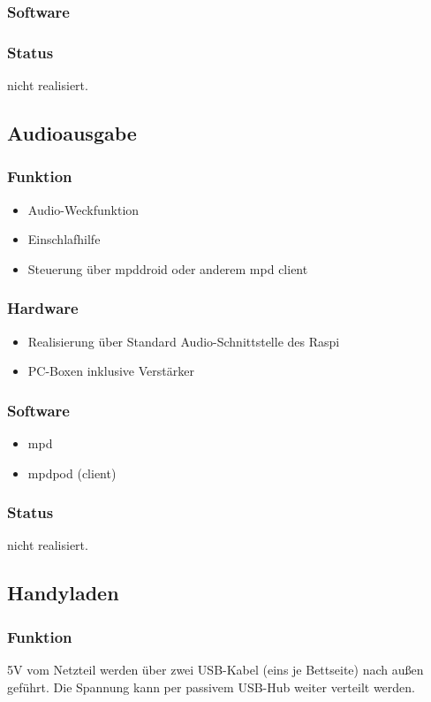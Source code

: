 \documentclass[a4paper,twoside,titlepage,normalheadings,tocleft,bibtotoc]{scrartcl}
\begin{document}
\subsubsection{Software}
\subsubsection{Status}
nicht realisiert.

\subsection{Audioausgabe}
\subsubsection{Funktion}
\begin{itemize}
\item Audio-Weckfunktion
\item Einschlafhilfe
\item Steuerung über mpddroid oder anderem mpd client
\end{itemize}

\subsubsection{Hardware}
\begin{itemize}
\item Realisierung über Standard Audio-Schnittstelle des Raspi
\item PC-Boxen inklusive Verstärker
\end{itemize}

\subsubsection{Software}
\begin{itemize}
\item mpd
\item mpdpod (client)
\end{itemize}

\subsubsection{Status}
nicht realisiert.

\subsection{Handyladen}
\subsubsection{Funktion}
5V vom Netzteil werden über zwei USB-Kabel (eins je Bettseite) nach außen geführt. Die Spannung kann per passivem USB-Hub weiter verteilt werden.
\end{document}
